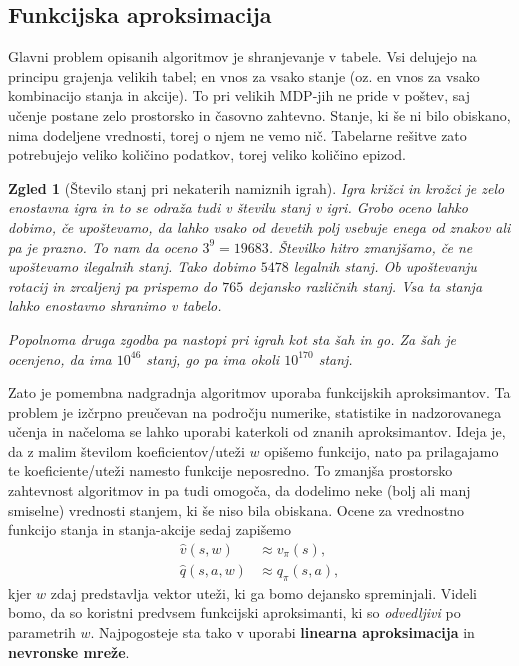 \documentclass[12pt,a4paper]{amsart}
\theoremstyle{definition} %
\theoremstyle{plain} %
\newtheorem{zgled}[definicija]{Zgled}
\begin{document}
\subsection{Funkcijska aproksimacija}
Glavni problem opisanih algoritmov je shranjevanje v tabele. Vsi delujejo na principu grajenja 
velikih tabel; en vnos za vsako stanje (oz. en vnos za vsako kombinacijo stanja in akcije). To pri 
velikih MDP-jih ne pride v poštev, saj učenje postane zelo prostorsko in časovno zahtevno. Stanje, 
ki še ni bilo obiskano, nima dodeljene vrednosti, torej o njem ne vemo nič. Tabelarne rešitve zato 
potrebujejo veliko količino podatkov, torej veliko količino epizod.  

\begin{zgled}[Število stanj pri nekaterih namiznih igrah]
    Igra križci in krožci je zelo enostavna igra in to se odraža tudi v številu stanj v igri. 
    Grobo oceno lahko dobimo, če upoštevamo, da lahko vsako od devetih polj vsebuje enega od znakov 
    ali pa je prazno. To nam da oceno $3^9 = 19683$. Številko hitro zmanjšamo, če ne upoštevamo 
    ilegalnih stanj. Tako dobimo $5478$ legalnih stanj. Ob upoštevanju rotacij in zrcaljenj pa 
    prispemo do $765$ dejansko različnih stanj. Vsa ta stanja lahko enostavno shranimo v tabelo. 

    Popolnoma druga zgodba pa nastopi pri igrah kot sta šah in go. Za šah je ocenjeno, da ima 
    $10^{46}$ stanj, go pa ima okoli $10^{170}$ stanj.
\end{zgled}

Zato je pomembna nadgradnja algoritmov uporaba funkcijskih aproksimantov. Ta problem je izčrpno 
preučevan na področju numerike, statistike in nadzorovanega učenja in načeloma se lahko uporabi 
katerkoli od znanih aproksimantov. Ideja je, da z malim številom koeficientov/uteži $w$ opišemo 
funkcijo, nato pa prilagajamo te koeficiente/uteži namesto funkcije neposredno. To zmanjša prostorsko 
zahtevnost algoritmov in pa tudi omogoča, da dodelimo neke (bolj ali manj smiselne) vrednosti stanjem, 
ki še niso bila obiskana. Ocene za vrednostno funkcijo stanja in stanja-akcije sedaj zapišemo
\begin{align*}
    \hat{v}(s, w) &\approx v_\pi(s), \\
    \hat{q}(s, a, w) &\approx q_\pi(s, a), 
\end{align*}
kjer $w$ zdaj predstavlja vektor uteži, ki ga bomo dejansko spreminjali. Videli bomo, da so koristni
predvsem funkcijski aproksimanti, ki so \textit{odvedljivi} po parametrih $w$. Najpogosteje sta tako v 
uporabi \textbf{linearna aproksimacija} in \textbf{nevronske mreže}. 
\end{document}
